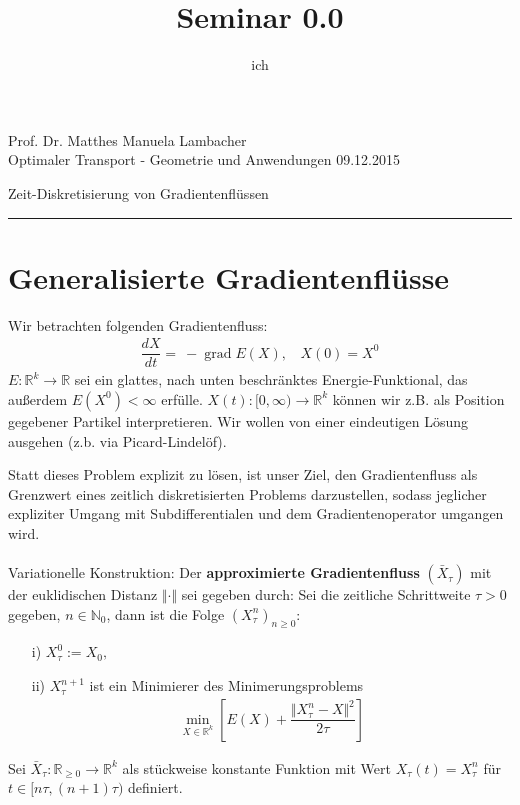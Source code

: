 \documentclass[11pt,a4paper,notitlepage]{scrreprt}
\author{ich}
\title{Seminar 0.0}
\newcommand{\RR}{\mathbb{R}}
\newcommand{\NN}{\mathbb{N}}
\newcommand{\grad}{\operatorname{grad}}
\begin{document}
\parindent 0pt



\pagestyle{plain}



 Prof. Dr. Matthes \hfill Manuela Lambacher\\
 Optimaler Transport - Geometrie und Anwendungen \hfill 09.12.2015
 \begin{center}
  {\huge{Zeit-Diskretisierung von Gradientenflüssen}} 
 \end{center}
 
 \hrule
 
\renewcommand{\thechapter}{\arabic{section}}
\renewcommand{\thesection}{\arabic{section}}
\section{Generalisierte Gradientenflüsse}

Wir betrachten folgenden Gradientenfluss:
\begin{eqnarray}
\dfrac{dX}{dt}=~-\grad E(X),~~~~X(0)=X^0 \label{eq1}
\end{eqnarray}
$E:\RR^k\to\RR$ sei ein glattes, nach unten beschränktes Energie-Funktional, das außerdem $E(X^0)<\infty$ erfülle. $X(t):[0,\infty)\to\RR^k$ können wir z.B. als Position gegebener Partikel interpretieren. Wir wollen von einer eindeutigen Lösung ausgehen (z.b. via Picard-Lindelöf).\newline


Statt dieses Problem explizit zu lösen, ist unser Ziel, den Gradientenfluss als Grenzwert eines zeitlich diskretisierten Problems darzustellen, sodass jeglicher expliziter Umgang mit Subdifferentialen und dem Gradientenoperator umgangen wird.\\\\

Variationelle Konstruktion:
Der \textbf{approximierte Gradientenfluss} $(\bar{X}_\tau)$ mit der euklidischen Distanz $\Vert \cdot \Vert$ sei gegeben durch:
\newline
Sei die zeitliche Schrittweite $\tau > 0$ gegeben, $n\in\NN_0$, dann ist die Folge $\left( X^n_\tau \right)_{n\geq 0}$:
\begin{itemize}
\item[i)]$X_\tau^0:=X_0,$
\item[ii)]$X_\tau^{n+1}$ ist ein Minimierer des Minimerungsproblems
\begin{eqnarray}
\min_{X\in\RR^k}\left[E(X)+\dfrac{\Vert X_\tau^n-X\Vert^2}{2\tau}\right] \label{Min}
\end{eqnarray}
\end{itemize}
Sei $\bar{X}_\tau:\RR_{\geq0}\to\RR^k$  als stückweise konstante Funktion mit Wert $X_\tau(t)=X^n_\tau$ für $t\in [n\tau,(n+1)\tau)$ definiert.
\end{document}
